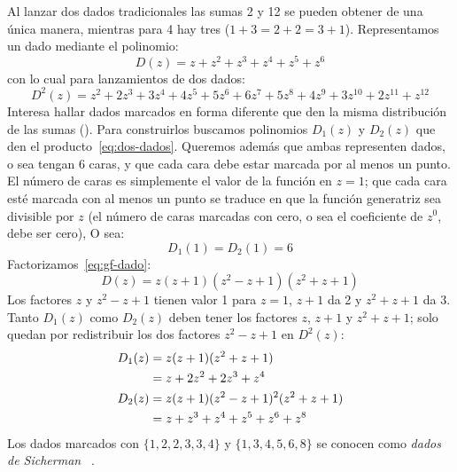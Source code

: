   Al lanzar dos dados tradicionales
  las sumas \num{2} y \num{12} se pueden obtener de una única manera,
  mientras para \num{4} hay tres (\(1 + 3 = 2 + 2 = 3 + 1\)).
  Representamos un dado mediante el polinomio:
  \begin{equation}
    \label{eq:gf-dado}
    D(z)
      = z + z^2 + z^3 + z^4 + z^5 + z^6
  \end{equation}
  con lo cual para lanzamientos de dos dados:
  \begin{equation}
    \label{eq:dos-dados}
    D^2(z)
      = z^2 + 2 z^3 + 3 z^4 + 4 z^5 + 5 z^6 + 6 z^7
          + 5 z^8 + 4 z^9 + 3 z^{10} + 2 z^{11} + z^{12}
  \end{equation}
  Interesa hallar dados marcados en forma diferente
  que den la misma distribución de las sumas
  ().%
  Para construirlos
  buscamos polinomios \(D_1(z)\) y \(D_2(z)\)
  que den el producto~\eqref{eq:dos-dados}.
  Queremos además que ambas representen dados,
  o sea tengan \num{6} caras,
  y que cada cara debe estar marcada por al menos un punto.
  El número de caras
  es simplemente el valor de la función en \(z = 1\);
  que cada cara esté marcada con al menos un punto
  se traduce en que la función generatriz sea divisible por \(z\)
  (el número de caras marcadas con cero,
   o sea el coeficiente de \(z^0\),
   debe ser cero),
  O sea:
  \begin{equation}
    \label{eq:dados-locos-caras}
    D_1(1)
      = D_2(1)
      = 6
  \end{equation}
  Factorizamos~\eqref{eq:gf-dado}:
  \begin{equation}
    \label{eq:gf-dado-factorizada}
    D(z)
      = z (z + 1) (z^2 - z + 1) (z^2 + z + 1)
  \end{equation}
  Los factores \(z\) y \(z^2 - z + 1\) tienen valor \num{1} para \(z = 1\),
  \(z + 1\) da \num{2} y \(z^2 + z + 1\) da \num{3}.
  Tanto \(D_1(z)\) como \(D_2(z)\)
  deben tener los factores \(z\),
  \(z + 1\) y \(z^2 + z + 1\);
  solo quedan por redistribuir los dos factores \(z^2 - z + 1\) en \(D^2(z)\):
  \begin{align}
    D_1(z)
      &= z (z + 1) (z^2 + z + 1) \notag \\
      &= z + 2 z^2 + 2 z^3 + z^4 \label{eq:Sicherman-1} \\
    D_2(z)
      &= z (z + 1) (z^2 - z + 1)^2 (z^2 + z + 1) \notag \\
      &= z + z^3 + z^4 + z^5 + z^6 + z^8 \label{eq:Sicherman-2}
  \end{align}
  Los dados marcados con \(\{ 1, 2, 2, 3, 3, 4 \}\)
  y \(\{ 1, 3, 4, 5, 6, 8 \}\)
  se conocen como \emph{dados de Sicherman}~%
    \cite{gardner78_2:_mathem_games}.

